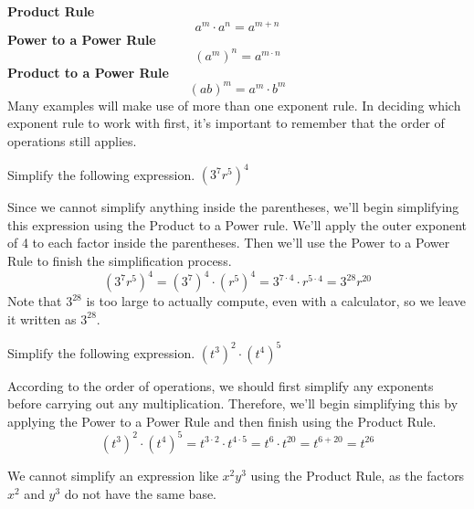 \documentclass{ximera}
\begin{document}
\textbf{Product Rule}
\[
            a^{m} \cdot a^{n} = a^{m+n}
\]
\textbf{Power to a Power Rule}
   \[
           (a^{m})^{n} = a^{m\cdot n}
   \]
 \textbf{ Product to a Power Rule}
   \[
           (ab)^{m} = a^{m} \cdot b^{m}
   \]  
      Many examples will make use of more than one exponent rule.
      In deciding which exponent rule to work with first,
      it's important to remember that the order of operations still applies.
\begin{example} Simplify the following expression.
                $\left(3^7r^5\right)^4$\\
    \begin{explanation}
                Since we cannot simplify anything inside the parentheses, we'll begin simplifying this expression using the Product to a Power rule.
                We'll apply the outer exponent of 4 to each factor inside the parentheses.
                Then we'll use the Power to a Power Rule to finish the simplification process.
      \[          
                  \left(3^7r^5\right)^4 = \left(3^7\right)^4 \cdot \left(r^5\right)^4
                  = 3^{7\cdot4} \cdot r^{5\cdot 4}
                  = 3^{28}r^{20}
         \]      
                Note that $3^{28}$ is too large to actually compute, even with a calculator,
                so we leave it written as $3^{28}$.
\end{explanation}
\end{example}
\begin{example}
Simplify the following expression.
       $\left(t^3\right)^2\cdot \left(t^4\right)^5$\\
\begin{explanation}
                According to the order of operations,
                we should first simplify any exponents before carrying out any multiplication.
                Therefore, we'll begin simplifying this by applying the Power to a Power Rule and then finish using the Product Rule.
           \[
                  \left(t^3\right)^2\cdot \left(t^4\right)^5 = t^{3\cdot2}\cdot t^{4\cdot5}
                  = t^6 \cdot t^{20}
                  = t^{6+20}
                  = t^{26}
\]
\end{explanation}
\end{example}
 \begin{remark} 
        We cannot simplify an expression like $x^2y^3$ using the Product Rule,
        as the factors $x^2$ and $y^3$ do not have the same base.
\end{remark}
\end{document}
